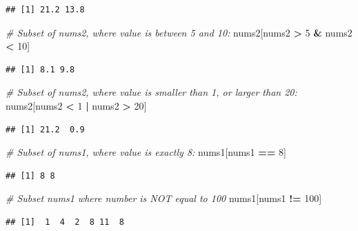 \documentclass[]{book}
\newenvironment{Shaded}{\begin{snugshade}}{\end{snugshade}}
\newcommand{\CommentTok}[1]{\textcolor[rgb]{0.56,0.35,0.01}{\textit{#1}}}
\newcommand{\DecValTok}[1]{\textcolor[rgb]{0.00,0.00,0.81}{#1}}
\newcommand{\NormalTok}[1]{#1}
\newcommand{\OperatorTok}[1]{\textcolor[rgb]{0.81,0.36,0.00}{\textbf{#1}}}
\newcommand{\StringTok}[1]{\textcolor[rgb]{0.31,0.60,0.02}{#1}}
\begin{document}
\begin{verbatim}
## [1] 21.2 13.8
\end{verbatim}

\begin{Shaded}
\begin{Highlighting}[]
\CommentTok{# Subset of nums2, where value is between 5 and 10:}
\NormalTok{nums2[nums2 }\OperatorTok{>}\StringTok{ }\DecValTok{5} \OperatorTok{&}\StringTok{ }\NormalTok{nums2 }\OperatorTok{<}\StringTok{ }\DecValTok{10}\NormalTok{]}
\end{Highlighting}
\end{Shaded}

\begin{verbatim}
## [1] 8.1 9.8
\end{verbatim}

\begin{Shaded}
\begin{Highlighting}[]
\CommentTok{# Subset of nums2, where value is smaller than 1, or larger than 20:}
\NormalTok{nums2[nums2 }\OperatorTok{<}\StringTok{ }\DecValTok{1} \OperatorTok{|}\StringTok{ }\NormalTok{nums2 }\OperatorTok{>}\StringTok{ }\DecValTok{20}\NormalTok{]}
\end{Highlighting}
\end{Shaded}

\begin{verbatim}
## [1] 21.2  0.9
\end{verbatim}

\begin{Shaded}
\begin{Highlighting}[]
\CommentTok{# Subset of nums1, where value is exactly 8:}
\NormalTok{nums1[nums1 }\OperatorTok{==}\StringTok{ }\DecValTok{8}\NormalTok{]}
\end{Highlighting}
\end{Shaded}

\begin{verbatim}
## [1] 8 8
\end{verbatim}

\begin{Shaded}
\begin{Highlighting}[]
\CommentTok{# Subset nums1 where number is NOT equal to 100}
\NormalTok{nums1[nums1 }\OperatorTok{!=}\StringTok{ }\DecValTok{100}\NormalTok{]}
\end{Highlighting}
\end{Shaded}

\begin{verbatim}
## [1]  1  4  2  8 11  8
\end{verbatim}
\end{document}
